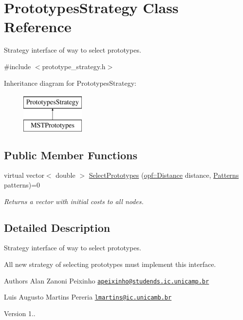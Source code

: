 \hypertarget{classPrototypesStrategy}{\section{Prototypes\+Strategy Class Reference}
\label{classPrototypesStrategy}
}


Strategy interface of way to select prototypes.  




{\ttfamily \#include $<$prototype\+\_\+strategy.\+h$>$}

Inheritance diagram for Prototypes\+Strategy\+:\begin{figure}[H]
\begin{center}
\leavevmode
\includegraphics[height=2.000000cm]{classPrototypesStrategy}
\end{center}
\end{figure}
\subsection*{Public Member Functions}
\begin{DoxyCompactItemize}
\item 
virtual vector$<$ double $>$ \hyperlink{classPrototypesStrategy_a0422be14bb6be39a2d06112daf7043c1}{Select\+Prototypes} (\hyperlink{namespaceopf_a61631393754e0aa6aaeacf0767b2b419}{opf\+::\+Distance} distance, \hyperlink{classPatterns}{Patterns} patterns)=0
\begin{DoxyCompactList}\small\item\em Returns a vector with initial costs to all nodes. \end{DoxyCompactList}\end{DoxyCompactItemize}


\subsection{Detailed Description}
Strategy interface of way to select prototypes. 

All new strategy of selecting prototypes must implement this interface. \begin{DoxyAuthor}{Authors}
Alan Zanoni Peixinho \href{mailto:apeixinho@studends.ic.unicamp.br}{\tt apeixinho@studends.\+ic.\+unicamp.\+br} 

Luis Augusto Martins Pereria \href{mailto:lmartins@ic.unicamb.br}{\tt lmartins@ic.\+unicamb.\+br} 
\end{DoxyAuthor}
\begin{DoxyVersion}{Version}
1.. 
\end{DoxyVersion}



